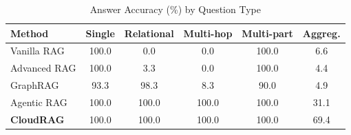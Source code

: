 \begin{table}[!htbp]
\centering
\caption{Answer Accuracy (\%) by Question Type}
\label{tab:bytype}
\footnotesize
\begin{tabular*}{\columnwidth}{@{\extracolsep{\fill}}lccccc@{}}
\toprule
Method & Single & Relational & Multi-hop & Multi-part & Aggreg. \\
\midrule
Vanilla RAG & 100.0 & 0.0 & 0.0 & 100.0 & 6.6 \\
Advanced RAG & 100.0 & 3.3 & 0.0 & 100.0 & 4.4 \\
GraphRAG & 93.3 & 98.3 & 8.3 & 90.0 & 4.9 \\
Agentic RAG & 100.0 & 100.0 & 100.0 & 100.0 & 31.1 \\
\textbf{CloudRAG} & 100.0 & 100.0 & 100.0 & 100.0 & 69.4 \\
\bottomrule
\end{tabular*}
\end{table}

